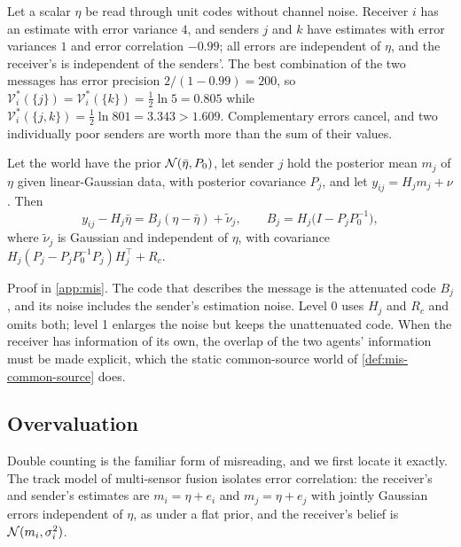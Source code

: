 \begin{example}\label{ex:mis-nonsubmodular}
Let a scalar $\eta$ be read through unit codes without channel noise. Receiver $i$ has an estimate with error variance $4$, and senders $j$ and $k$ have estimates with error variances $1$ and error correlation $-0.99$; all errors are independent of $\eta$, and the receiver's is independent of the senders'. The best combination of the two messages has error precision $2/(1-0.99)=200$, so $\mathcal V^\ast_i(\{j\})=\mathcal V^\ast_i(\{k\})=\tfrac12\ln5=0.805$ while $\mathcal V^\ast_i(\{j,k\})=\tfrac12\ln801=3.343>1.609$. Complementary errors cancel, and two individually poor senders are worth more than the sum of their values.
\end{example}

\begin{lemma}\label{lem:mis-attenuation}
Let the world have the prior $\mathcal{N}(\bar\eta,P_0)$, let sender $j$ hold the posterior mean $m_j$ of $\eta$ given linear-Gaussian data, with posterior covariance $P_j$, and let $y_{ij}=H_jm_j+\nu$. Then
\begin{equation}\label{eq:mis-attenuation}
y_{ij}-H_j\bar\eta=B_j(\eta-\bar\eta)+\tilde\nu_j,\qquad B_j=H_j\bigl(I-P_jP_0^{-1}\bigr),
\end{equation}
where $\tilde\nu_j$ is Gaussian and independent of $\eta$, with covariance $H_j(P_j-P_jP_0^{-1}P_j)H_j^\top+R_c$.
\end{lemma}

Proof in \cref{app:mis}. The code that describes the message is the attenuated code $B_j$, and its noise includes the sender's estimation noise. Level 0 uses $H_j$ and $R_c$ and omits both; level 1 enlarges the noise but keeps the unattenuated code. When the receiver has information of its own, the overlap of the two agents' information must be made explicit, which the static common-source world of \cref{def:mis-common-source} does.

\subsection{Overvaluation}\label{sup:mis-overvaluation}

Double counting is the familiar form of misreading, and we first locate it exactly. The track model of multi-sensor fusion isolates error correlation: the receiver's and sender's estimates are $m_i=\eta+e_i$ and $m_j=\eta+e_j$ with jointly Gaussian errors independent of $\eta$, as under a flat prior, and the receiver's belief is $\mathcal{N}(m_i,\sigma_i^2)$.

